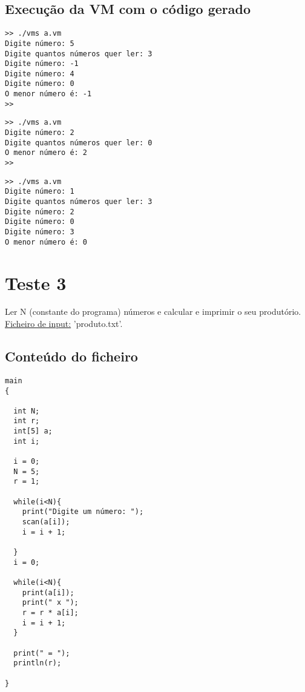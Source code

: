 \documentclass[11pt,a4paper]{report}%
\begin{document}
\subsection{Execução da VM com o código gerado}

\begin{verbatim}
>> ./vms a.vm
Digite número: 5
Digite quantos números quer ler: 3
Digite número: -1
Digite número: 4
Digite número: 0
O menor número é: -1
>>
\end{verbatim}

\begin{verbatim}
>> ./vms a.vm
Digite número: 2
Digite quantos números quer ler: 0
O menor número é: 2
>>
\end{verbatim}

\begin{verbatim}
>> ./vms a.vm
Digite número: 1
Digite quantos números quer ler: 3
Digite número: 2
Digite número: 0
Digite número: 3
O menor número é: 0
\end{verbatim}

\section{Teste 3}
Ler N (constante do programa) números e calcular e imprimir o seu produtório. \\
\underline{Ficheiro de input:} 'produto.txt'.

\subsection{Conteúdo do ficheiro}

\begin{verbatim}
main
{
  
  int N;
  int r;
  int[5] a;
  int i;

  i = 0;
  N = 5;
  r = 1;
  
  while(i<N){
    print("Digite um número: ");
    scan(a[i]);
    i = i + 1;

  }
  i = 0;

  while(i<N){
    print(a[i]);
    print(" x ");
    r = r * a[i];
    i = i + 1;
  }
  
  print(" = ");
  println(r);

}
\end{verbatim}
\end{document}
